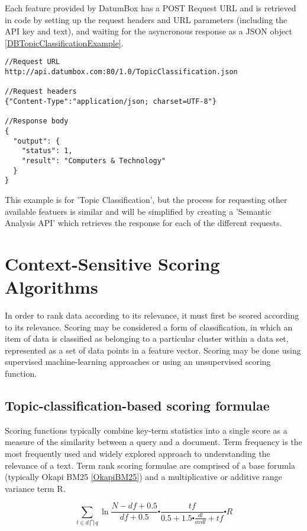 Each feature provided by DatumBox has a POST Request URL and is retrieved in code by setting up the request headers and URL parameters (including the API key and text), and waiting for the asyncronous response as a JSON object \ref{DBTopicClassificationExample}.

\lstset{language=Java, caption=DatumBox Topic Classification example, label=DBTopicClassificationExample}
\begin{lstlisting}
//Request URL
http://api.datumbox.com:80/1.0/TopicClassification.json

//Request headers
{"Content-Type":"application/json; charset=UTF-8"}

//Response body
{
  "output": {
    "status": 1,
    "result": "Computers & Technology"
  }
}
\end{lstlisting}
This example is for 'Topic Classification', but the process for requesting other available featuers is similar and will be simplified by creating a 'Semantic Analysis API' which retrieves the response for each of the different requests. 

\section{Context-Sensitive Scoring Algorithms}

In order to rank data according to its relevance, it must first be scored according to its relevance. Scoring may be considered a form of classification, in which an item of data is classified as belonging to a particular cluster within a data set, represented as a set of data points in a feature vector. Scoring may be done using supervised machine-learning approaches or using an unsupervised scoring function. 

\subsection{Topic-classification-based scoring formulae}

Scoring functions typically combine key-term statistics into a single score as a measure of the similarity between a query and a document.
Term frequency is the most frequently used and widely explored approach to understanding the relevance of a text. Term rank scoring formulae are comprised of a base forumla (typically Okapi BM25 \ref{OkapiBM25}) and a multiplicative or additive range variance term R.

\begin{equation}\label{OkapiBM25}
	\sum\limits_{t\in d \bigcap q} \ln{\frac{N-df+0.5}{df+0.5}}\centerdot \frac{tf}{0.5+1.5 \centerdot \frac{dl}{avdl}+tf} \centerdot R
\end{equation}

